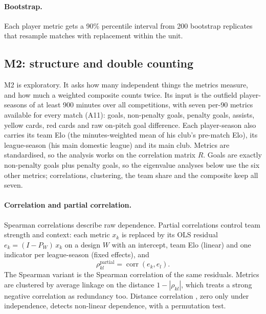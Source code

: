 \documentclass[11pt,a4paper]{article}
\DeclareMathOperator{\corr}{corr}
\begin{document}
\paragraph{Bootstrap.}
Each player metric gets a 90\% percentile interval from 200 bootstrap
replicates \citep{efron1979bootstrap} that resample matches with replacement
within the unit.

\subsection{M2: structure and double counting}
\label{sec:m2}

M2 is exploratory. It asks how many independent things the metrics measure,
and how much a weighted composite counts twice. Its input is the outfield
player-seasons of at least 900 minutes over all competitions, with seven per-90
metrics available for every match (A11): goals, non-penalty goals, penalty
goals, assists, yellow cards, red cards and raw on-pitch goal difference. Each
player-season also carries its team Elo (the minutes-weighted mean of his
club's pre-match Elo), its league-season (his main domestic league) and its
main club. Metrics are standardised, so the analysis works on the correlation
matrix $R$. Goals are exactly non-penalty goals plus penalty goals, so the
eigenvalue analyses below use the six other metrics; correlations, clustering,
the team share and the composite keep all seven.

\paragraph{Correlation and partial correlation.}
Spearman correlations describe raw dependence. Partial correlations control
team strength and context: each metric $x_k$ is replaced by its OLS residual
$e_k = (I - P_W)\, x_k$ on a design $W$ with an intercept, team Elo (linear) and
one indicator per league-season (fixed effects), and
\begin{equation}
  \rho^{\text{partial}}_{kl} = \corr(e_k, e_l).
  \label{eq:partial}
\end{equation}
The Spearman variant is the Spearman correlation of the same residuals.
Metrics are clustered by average linkage on the distance $1 - |\rho_{kl}|$,
which treats a strong negative correlation as redundancy too. Distance
correlation \citep{szekely2007dcor}, zero only under independence, detects
non-linear dependence, with a permutation test.
\end{document}
